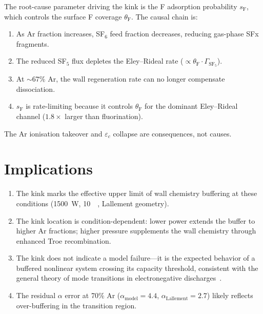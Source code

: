 \documentclass[11pt,a4paper]{report}
\begin{document}
The root-cause parameter driving the kink is the F adsorption probability $s_\mathrm{F}$, which controls the surface F coverage $\theta_\mathrm{F}$.  The causal chain is:
\begin{enumerate}[nosep]
\item As Ar fraction increases, SF$_6$ feed fraction decreases, reducing gas-phase SFx fragments.
\item The reduced SF$_5$ flux depletes the Eley--Rideal rate ($\propto \theta_\mathrm{F} \cdot \Gamma_\mathrm{SF_5}$).
\item At ${\sim}67\%$ Ar, the wall regeneration rate can no longer compensate dissociation.
\item $s_\mathrm{F}$ is rate-limiting because it controls $\theta_\mathrm{F}$ for the dominant Eley--Rideal channel ($1.8\times$ larger than fluorination).
\end{enumerate}

The Ar ionisation takeover and $\varepsilon_c$ collapse are consequences, not causes.

\section{Implications}
\label{sec:kink_implications}

\begin{enumerate}[leftmargin=*,nosep]
\item The kink marks the effective upper limit of wall chemistry buffering at these conditions (\SI{1500}{\watt}, \SI{10}{\milli\torr}, Lallement geometry).
\item The kink location is condition-dependent: lower power extends the buffer to higher Ar fractions; higher pressure supplements the wall chemistry through enhanced Troe recombination.
\item The kink does not indicate a model failure---it is the expected behavior of a buffered nonlinear system crossing its capacity threshold, consistent with the general theory of mode transitions in electronegative discharges~\cite{Lichtenberg1997,Lieberman2005}.
\item The residual $\alpha$ error at 70\% Ar ($\alpha_\mathrm{model} = 4.4$, $\alpha_\mathrm{Lallement} = 2.7$) likely reflects over-buffering in the transition region.
\end{enumerate}

\end{document}
